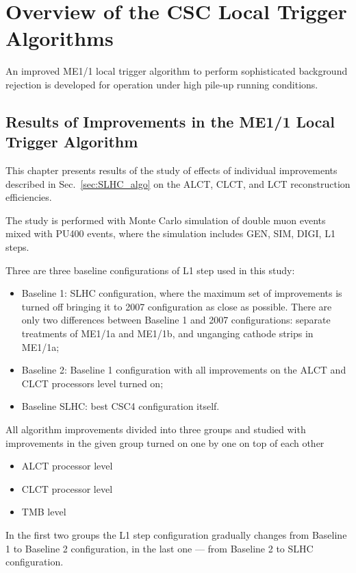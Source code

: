 \section{Overview of the CSC Local Trigger Algorithms}
\label{sec:csc_algo}

An improved ME1/1 local trigger algorithm to perform sophisticated background rejection is developed for operation under high pile-up running conditions.

\subsection{Results of Improvements in the ME1/1 Local Trigger Algorithm}
\label{sec:SLHC_algo_results}

This chapter presents results of the study of effects of individual improvements described in Sec.~\ref{sec:SLHC_algo} on the ALCT, CLCT, and LCT reconstruction efficiencies.

The study is performed with Monte Carlo simulation of double muon events mixed with PU400 events, where the simulation includes GEN, SIM, DIGI, L1 steps.

Three are three baseline configurations of L1 step used in this study:
\begin{itemize}
	\item Baseline 1: SLHC configuration, where the maximum set of improvements is turned off bringing it to 2007 configuration as close as possible. 
	There are only two differences between Baseline 1 and 2007 configurations: separate treatments of ME1/1a and ME1/1b, and unganging cathode strips in ME1/1a;
	\item Baseline 2: Baseline 1 configuration with all improvements on the ALCT and CLCT processors level turned on;
	\item Baseline SLHC: best CSC4 configuration itself.
\end{itemize}

All algorithm improvements divided into three groups and studied with improvements in the given group turned on one by one on top of each other
\begin{itemize}
	\item ALCT processor level
	\item CLCT processor level
	\item TMB level
\end{itemize}

In the first two groups the L1 step configuration gradually changes from Baseline 1 to Baseline 2 configuration, in the last one --- from Baseline 2 to SLHC configuration.